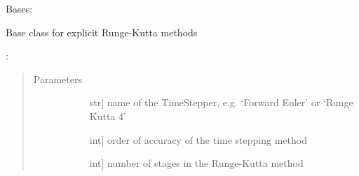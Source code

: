 \documentclass[letterpaper,10pt,english]{sphinxmanual}
\begin{document}
\begin{fulllineitems}
\label{\detokenize{spitfire.time.methods:spitfire.time.methods.ExplicitRungeKutta}}
Bases: {\hyperref[\detokenize{spitfire.time.methods:spitfire.time.methods.TimeStepper}]{}}

Base class for explicit Runge-Kutta methods

:
\begin{quote}\begin{description}
\item[{Parameters}] \leavevmode\begin{description}
\item[{}] \leavevmode{[}str{]}
name of the TimeStepper, e.g. ‘Forward Euler’ or ‘Runge Kutta 4’

\item[{}] \leavevmode{[}int{]}
order of accuracy of the time stepping method

\item[{}] \leavevmode{[}int{]}
number of stages in the Runge-Kutta method

\end{description}

\end{description}\end{quote}

\begin{fulllineitems}
\label{\detokenize{spitfire.time.methods:spitfire.time.methods.ExplicitRungeKutta.stages}}~
\end{fulllineitems}


\end{fulllineitems}

\end{document}
